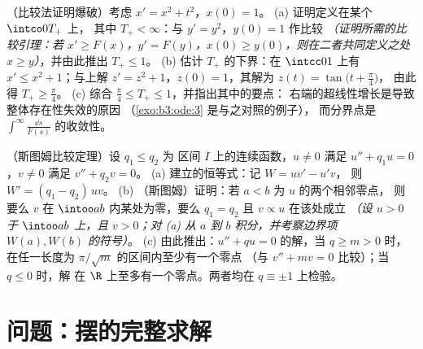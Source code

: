 \begin{exercise}[$\star\star$]\label{exo:b3:ode:11}
（比较法证明爆破）考虑 $x' = x^2 + t^2$，$x(0) =
1$。
(a) 证明定义在某个 $\intco0{T_+}$ 上，
其中 $T_+ < \infty$：与 $y' = y^2$，$y(0) = 1$ 作比较
\emph{（证明所需的比较引理：若 $x' \geq
F(x)$，$y' = F(y)$，$x(0) \geq y(0)$，则在二者共同定义之处 $x \geq
y$）}，并由此推出 $T_+ \leq 1$。
(b) 估计 $T_+$ 的下界：在 $\intcc01$ 上有 $x' \leq x^2 +
1$；与上解 $z' = z^2 + 1$，$z(0) =
1$，其解为 $z(t) = \tan\bigl(t + \frac\pi4\bigr)$，
由此得 $T_+ \geq \frac\pi4$。
(c) 综合 $\frac\pi4 \leq T_+ \leq 1$，并指出其中的要点：
右端的超线性增长是导致整体存在性失效的原因
（\cref{exo:b3:ode:3} 是与之对照的例子），
而分界点是
$\int^{\infty}\frac{\dd s}{F(s)}$ 的收敛性。
\end{exercise}

\begin{exercise}[$\star\star\star$]\label{exo:b3:ode:12}
（斯图姆比较定理）设 $q_1 \leq q_2$ 为
区间 $I$ 上的连续函数，$u \neq 0$ 满足 $u''
+ q_1u = 0$，$v \neq 0$ 满足 $v'' + q_2v = 0$。
(a) 建立的恒等式：记 $W = uv' - u'v$，
则 $W' = (q_1 - q_2)\,uv$。
(b) （斯图姆）证明：若 $a < b$ 为 $u$ 的两个相邻零点，
则要么 $v$ 在 $\intoo ab$ 内某处为零，要么
$q_1 = q_2$ 且 $v \propto u$ 在该处成立 \emph{（设 $u > 0$
于 $\intoo ab$ 上，且 $v > 0$；对 (a) 从 $a$ 到
$b$ 积分，并考察边界项 $W(a),
W(b)$ 的符号）}。
(c) 由此推出：$u'' + qu = 0$ 的解，当 $q \geq m > 0$ 时，
在任一长度为 $\pi/\sqrt m$ 的区间内至少有一个零点
（与 $v'' + mv = 0$ 比较）；当 $q \leq 0$ 时，解
在 $\R$ 上至多有一个零点。两者均在
$q \equiv \pm1$ 上检验。
\end{exercise}

\section{问题：摆的完整求解}

